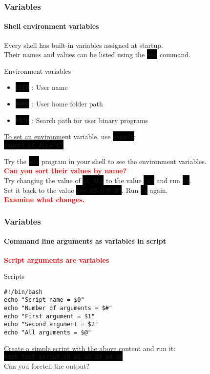 \documentclass[unknownkeysallowed, 10pt, a4 paper, handout]{beamer}
\newcommand{\focus}[1]{\textbf{\textcolor{red}{#1}}}
\newcommand{\code}[1]{\colorbox{black}{\color{green}\texttt{#1}}}
\begin{document}
\begin{frame}
  \frametitle{Variables}
  \framesubtitle{Shell environment variables}

  Every shell has built-in variables assigned at startup. \\
    Their names and values can be listed using the \code{env} command.
  \begin{exampleblock}{Environment variables}
    \begin{itemize}
      \item \code{USER} : User name
      \item \code{HOME} : User home folder path
      \item \code{PATH} : Search path for user binary programs
    \end{itemize}
    To set an environment variable, use \code{export}: \\
    \code{export LC\_ALL="C"}
  \end{exampleblock}

  \begin{alertblock}{}
    Try the \code{env} program in your shell to see the environment variables.\\
    \focus{Can you sort their values by name?} \\
    Try changing the value of \code{LC\_ALL} to the value \code{"C"} and
    run \code{ls}. \\
    Set it back to the value \code{"en\_US.UTF-8"}. Run \code{ls} again. \\
    \focus{Examine what changes.}
  \end{alertblock}
\end{frame}

\begin{frame}[fragile=singleslide]
  \frametitle{Variables}
  \framesubtitle{Command line arguments as variables in script}

  \focus{Script arguments are variables}

  \begin{exampleblock}{Scripts}
    \begin{verbatim}
#!/bin/bash
echo "Script name = $0"
echo "Number of arguments = $#"
echo "First argument = $1"
echo "Second argument = $2"
echo "All arguments = $@"
    \end{verbatim}
  \end{exampleblock}

  \begin{alertblock}{}
    Create a simple script with the above content and run it: \\
      \code{bash test\_script.sh a1 a2 a3 a4 a5} \\
    Can you foretell the output?
  \end{alertblock}
\end{frame}
\end{document}
